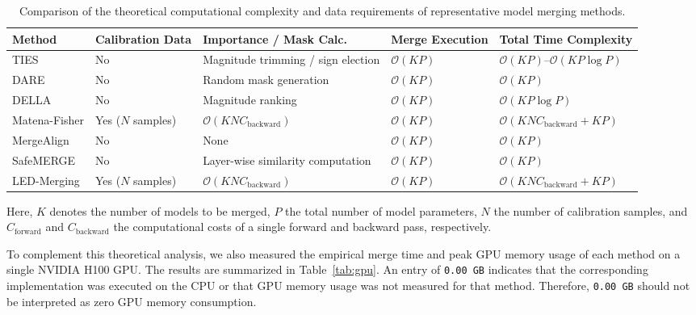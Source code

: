 \begin{table}[htbp]
\caption{Comparison of the theoretical computational complexity and data requirements of representative model merging methods.}
\label{tab:cost}
\centering
\small
\setlength{\tabcolsep}{3pt}
\renewcommand{\arraystretch}{1.10}
\begin{tabularx}{\textwidth}{
>{\raggedright\arraybackslash}p{1.85cm}
>{\centering\arraybackslash}p{1.70cm}
>{\raggedright\arraybackslash}p{3.25cm}
>{\centering\arraybackslash}p{1.75cm}
>{\raggedright\arraybackslash}X
}
\toprule
\textbf{Method} &
\textbf{Calibration Data} &
\textbf{Importance / Mask Calc.} &
\textbf{Merge Execution} &
\textbf{Total Time Complexity} \\
\midrule
TIES
& No
& Magnitude trimming / sign election
& $\mathcal{O}(KP)$
& $\mathcal{O}(KP)$--$\mathcal{O}(KP\log P)$ \\
\midrule
DARE
& No
& Random mask generation
& $\mathcal{O}(KP)$
& $\mathcal{O}(KP)$ \\
\midrule
DELLA
& No
& Magnitude ranking
& $\mathcal{O}(KP)$
& $\mathcal{O}(KP\log P)$ \\
\midrule
Matena-Fisher
& Yes ($N$ samples)
& $\mathcal{O}(KN C_{\text{backward}})$
& $\mathcal{O}(KP)$
& $\mathcal{O}(KN C_{\text{backward}} + KP)$ \\
\midrule
MergeAlign
& No
& None
& $\mathcal{O}(KP)$
& $\mathcal{O}(KP)$ \\
\midrule
SafeMERGE
& No
& Layer-wise similarity computation
& $\mathcal{O}(KP)$
& $\mathcal{O}(KP)$ \\
\midrule
LED-Merging
& Yes ($N$ samples)
& $\mathcal{O}(KN C_{\text{backward}})$
& $\mathcal{O}(KP)$
& $\mathcal{O}(KN C_{\text{backward}} + KP)$ \\
\bottomrule
\end{tabularx}
\end{table}


Here, $K$ denotes the number of models to be merged, $P$ the total number of model parameters, $N$ the number of calibration samples, and $C_{\mathrm{forward}}$ and $C_{\mathrm{backward}}$ the computational costs of a single forward and backward pass, respectively.

To complement this theoretical analysis, we also measured the empirical merge time and peak GPU memory usage of each method on a single NVIDIA H100 GPU. The results are summarized in Table~\ref{tab:gpu}. An entry of \texttt{0.00 GB} indicates that the corresponding implementation was executed on the CPU or that GPU memory usage was not measured for that method. Therefore, \texttt{0.00 GB} should not be interpreted as zero GPU memory consumption.

